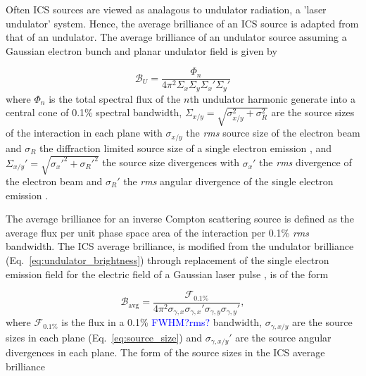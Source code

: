 \documentclass[../main.tex]{subfiles}
\begin{document}
Often ICS sources are viewed as analagous to undulator radiation, a 'laser undulator' system. Hence, the average brilliance of an ICS source is adapted from that of an undulator. The average brilliance of an undulator source assuming a Gaussian electron bunch and planar undulator field \cite{chao2013handbook} is given by 

\begin{equation}
\mathcal{B}_{U} = \frac{\Phi_{n}}{4\pi^{2}\Sigma_{x}\Sigma_{y}\Sigma_{x}'\Sigma_{y}'}
\label{eq:undulator_brightness}    
\end{equation}
where $\Phi_{n}$ is the total spectral flux of the $n$th undulator harmonic generate into a central cone of 0.1\% spectral bandwidth, $\Sigma_{x/y} = \sqrt{\sigma_{x/y}^{2}+\sigma_{R}^{2}}$ are the source sizes of the interaction in each plane with $\sigma_{x/y}$ the \textit{rms} source size of the electron beam and $\sigma_{R}$ the diffraction limited source size of a single electron emission \cite{kim1987brightness}, and $\Sigma_{x/y}' = \sqrt{\sigma_{x}'^{2}+\sigma_{R}'^{2}}$ the source size divergences with $\sigma_{x}'$ the \textit{rms} divergence of the electron beam and $\sigma_{R}'$ the \textit{rms} angular divergence of the single electron emission \cite{krinsky1983undulators}. 

The average brilliance for an inverse Compton scattering source is defined as the average flux per unit phase space area of the interaction per 0.1\% \textit{rms} bandwidth. The ICS average brilliance, is modified from the undulator brilliance (Eq.~\ref{eq:undulator_brightness}) through replacement of the single electron emission field for the electric field of a Gaussian laser pulse \cite{krafft2010compton,deitrick2018high}, is of the form   

\begin{equation}
\mathcal{B}_{\mathrm{avg}} = \frac{\mathcal{F}_{0.1\%}}{4\pi^{2}\sigma_{\gamma,x}\sigma_{\gamma,x}'\sigma_{\gamma,y}\sigma_{\gamma,y}'},
\label{eq:average_brightness}
\end{equation}
where $\mathcal{F}_{0.1\%}$ is the flux in a 0.1\%  \textcolor{blue}{FWHM?rms?} bandwidth, $\sigma_{\gamma,x/y}$ are the source sizes in each plane (Eq.~\ref{eq:source_size}) and $\sigma_{\gamma,x/y}'$ are the source angular divergences in each plane. The form of the source sizes in the ICS average brilliance 
\end{document}
